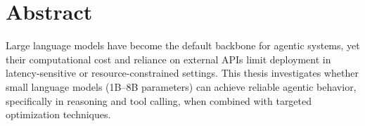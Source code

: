 \section*{Abstract}
Large language models have become the default backbone for agentic systems, yet their computational cost and reliance on external APIs limit deployment in latency-sensitive or resource-constrained settings. This thesis investigates whether small language models (1B--8B parameters) can achieve reliable agentic behavior, specifically in reasoning and tool calling, when combined with targeted optimization techniques.


